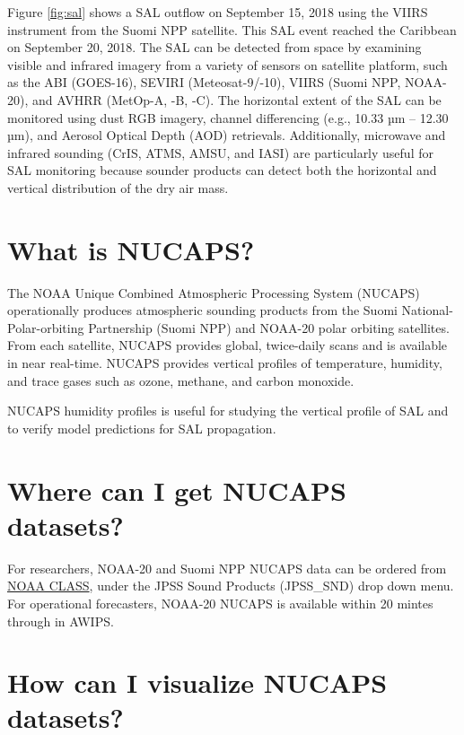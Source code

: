 \documentclass[11pt]{article}
\begin{document}
Figure \ref{fig:sal} shows a SAL outflow on September 15, 2018 using the VIIRS
instrument from the Suomi NPP satellite. This SAL event reached the
Caribbean on September 20, 2018. The SAL can be detected from space by examining visible and infrared imagery from a variety of sensors on satellite platform, such as the ABI (GOES-16), SEVIRI (Meteosat-9/-10), VIIRS (Suomi NPP, NOAA-20), and AVHRR (MetOp-A, -B, -C). The horizontal extent of the SAL can be monitored using dust RGB imagery, channel differencing (e.g., 10.33 µm -- 12.30 µm), and Aerosol Optical Depth (AOD) retrievals. Additionally, microwave and infrared sounding (CrIS, ATMS, AMSU, and IASI) are particularly useful for SAL monitoring because sounder products can detect both the horizontal and vertical distribution of the dry air mass.

\section{What is NUCAPS?}\label{what-is-nucaps}

The NOAA Unique Combined Atmospheric Processing System (NUCAPS)
operationally produces atmospheric sounding products from the Suomi
National-Polar-orbiting Partnership (Suomi NPP) and NOAA-20 polar orbiting
satellites. From each satellite, NUCAPS provides global, twice-daily
scans and is available in near real-time. NUCAPS provides vertical profiles
of temperature, humidity, and trace gases such as ozone, methane, and
carbon monoxide.

NUCAPS humidity profiles is useful for studying the vertical profile of
SAL and to verify model predictions for SAL propagation.

\section{Where can I get NUCAPS
datasets?}\label{where-can-i-get-nucaps-datasets}

For researchers, NOAA-20 and Suomi NPP NUCAPS data can be ordered from
\href{https://www.bou.class.noaa.gov/saa/products/search?sub_id=0\&datatype_family=JPSS_SND\&submit.x=24\&submit.y=7}{NOAA
CLASS}, under the JPSS Sound Products (JPSS\_SND) drop down menu. For operational forecasters, NOAA-20 NUCAPS is available within 20 mintes through in AWIPS.

\section{How can I visualize NUCAPS
datasets?}\label{how-can-i-visualize-nucaps-datasets}
\end{document}
